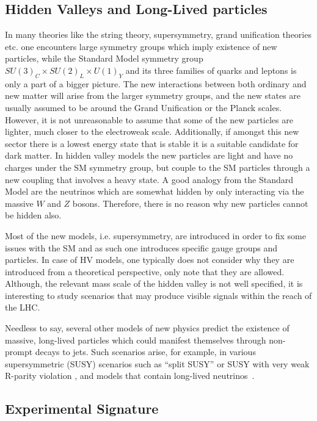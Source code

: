 \subsection{Hidden Valleys and Long-Lived particles}

In many theories like the string theory, supersymmetry, grand unification theories etc.
 one encounters large symmetry groups which imply existence of
new particles, while the Standard Model symmetry group $SU(3)_C \times SU(2)_L \times U(1)_Y$ 
and its three families of quarks
and leptons is only a part of a bigger picture.
The new interactions between
both ordinary and new matter will arise from the larger symmetry groups,  and  
the new states are usually
assumed to be around the Grand Unification or the Planck scales. However, it is not unreasonable
to assume that some of the new particles are lighter, much closer to the electroweak scale.
Additionally, if amongst
this new sector there is a lowest energy state that is stable it is a suitable candidate for
dark matter. 
In hidden valley models the new particles are light and have no charges under the SM 
symmetry group, but couple to the SM particles through a new coupling that involves a heavy state.
 A good analogy from the Standard Model are 
the neutrinos which are somewhat hidden by only interacting via the massive $W$ and $Z$ bosons.
Therefore, there is no reason why new particles cannot be hidden also. 


Most of the new models, i.e. supersymmetry, are introduced in order to fix some issues with the SM
and as such one introduces specific gauge groups and particles. In case of HV models, one typically
does not consider why they are introduced from a theoretical perspective, only note that they 
are allowed. Although, the relevant mass scale of the hidden valley is not well
specified, it is interesting to study scenarios that may produce visible signals within 
the reach of the LHC.




Needless to say, several other models of new physics predict the existence of massive, 
long-lived particles which could
manifest themselves through non-prompt decays to jets. Such scenarios arise, for example,
in various supersymmetric (SUSY) scenarios such as ``split SUSY''
\cite{Hewett:2004nw} or SUSY with very weak R-parity violation \cite{Barbier:2004ez}, and \Zprime models
that contain long-lived neutrinos~\cite{Basso:2008iv}.

\subsection{Experimental Signature}

